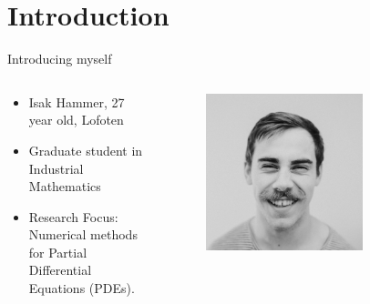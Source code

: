 \section{Introduction}


\begin{frame}{Introducing myself}
    \begin{columns}
        \begin{column}{0.5\textwidth}
            \begin{itemize}
                \item Isak Hammer, 27 year old, Lofoten
                \item Graduate student in Industrial Mathematics
                \item Research Focus: Numerical methods for Partial Differential Equations (PDEs).
            \end{itemize}
        \end{column}

        \begin{column}{0.5\textwidth}
            \begin{figure}
                \centering
                \includegraphics[width=0.7\textwidth]{figures/isak.jpg}
            \end{figure}
        \end{column}
    \end{columns}
\end{frame}

